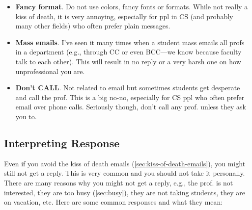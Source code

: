 \documentclass[oneside,11pt,dvipsnames]{book}
\begin{document}
\begin{itemize}
    \item \textbf{Fancy format}.  Do not use colors, fancy fonts or formats. While not really a kiss of death, it is very annoying, especially for ppl in CS (and probably many other fields) who often prefer plain messages.
    
    \item \textbf{Mass emails}. I've seen it many times when a student mass emails all profs in a department (e.g., through CC or even BCC---we know because faculty talk to each other).  This will result in no reply or a very harsh one on how unprofessional you are.
    
    \item \textbf{Don't CALL}. Not related to email but sometimes students get desperate and call the prof.  This is a big no-no, especially for CS ppl who often prefer email over phone calls. Seriously though, don't call any prof. unless they ask you to. 
\end{itemize}




\subsection{Interpreting Response}\label{sec:interpreting-response}
Even if you avoid the kiss of death emails (\autoref{sec:kiss-of-death-emails}), you might still not get a reply.  This is very common and you should not take it personally.  There are many reasons why you might not get a reply, e.g., the prof. is not interested, they are too busy (\autoref{sec:busy}), they are not taking students, they are on vacation, etc.  Here are some common responses and what they mean:
\end{document}
